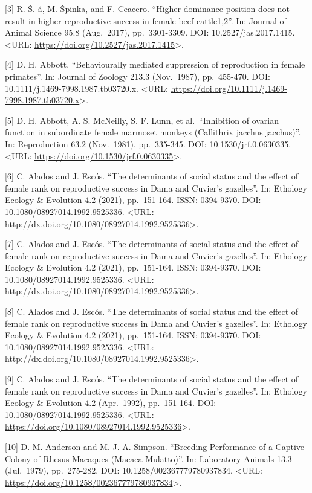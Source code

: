 \documentclass[
]{article}
\begin{document}
{[}3{]} R. Š. á, M. Špinka, and F. Ceacero. ``Higher dominance position
does not result in higher reproductive success in female beef
cattle1,2''. In: Journal of Animal Science 95.8 (Aug.~2017),
pp.~3301-3309. DOI: 10.2527/jas.2017.1415. \textless URL:
\url{https://doi.org/10.2527/jas.2017.1415}\textgreater.

{[}4{]} D. H. Abbott. ``Behaviourally mediated suppression of
reproduction in female primates''. In: Journal of Zoology 213.3
(Nov.~1987), pp.~455-470. DOI: 10.1111/j.1469-7998.1987.tb03720.x.
\textless URL:
\url{https://doi.org/10.1111/j.1469-7998.1987.tb03720.x}\textgreater.

{[}5{]} D. H. Abbott, A. S. McNeilly, S. F. Lunn, et al.~``Inhibition of
ovarian function in subordinate female marmoset monkeys (Callithrix
jacchus jacchus)''. In: Reproduction 63.2 (Nov.~1981), pp.~335-345. DOI:
10.1530/jrf.0.0630335. \textless URL:
\url{https://doi.org/10.1530/jrf.0.0630335}\textgreater.

{[}6{]} C. Alados and J. Escós. ``The determinants of social status and
the effect of female rank on reproductive success in Dama and Cuvier's
gazelles''. In: Ethology Ecology \& Evolution 4.2 (2021), pp.~151-164.
ISSN: 0394-9370. DOI: 10.1080/08927014.1992.9525336. \textless URL:
\url{http://dx.doi.org/10.1080/08927014.1992.9525336}\textgreater.

{[}7{]} C. Alados and J. Escós. ``The determinants of social status and
the effect of female rank on reproductive success in Dama and Cuvier's
gazelles''. In: Ethology Ecology \& Evolution 4.2 (2021), pp.~151-164.
ISSN: 0394-9370. DOI: 10.1080/08927014.1992.9525336. \textless URL:
\url{http://dx.doi.org/10.1080/08927014.1992.9525336}\textgreater.

{[}8{]} C. Alados and J. Escós. ``The determinants of social status and
the effect of female rank on reproductive success in Dama and Cuvier's
gazelles''. In: Ethology Ecology \& Evolution 4.2 (2021), pp.~151-164.
ISSN: 0394-9370. DOI: 10.1080/08927014.1992.9525336. \textless URL:
\url{http://dx.doi.org/10.1080/08927014.1992.9525336}\textgreater.

{[}9{]} C. Alados and J. Escós. ``The determinants of social status and
the effect of female rank on reproductive success in Dama and Cuvier's
gazelles''. In: Ethology Ecology \& Evolution 4.2 (Apr.~1992),
pp.~151-164. DOI: 10.1080/08927014.1992.9525336. \textless URL:
\url{https://doi.org/10.1080/08927014.1992.9525336}\textgreater.

{[}10{]} D. M. Anderson and M. J. A. Simpson. ``Breeding Performance of
a Captive Colony of Rhesus Macaques (Macaca Mulatto)''. In: Laboratory
Animals 13.3 (Jul.~1979), pp.~275-282. DOI: 10.1258/002367779780937834.
\textless URL:
\url{https://doi.org/10.1258/002367779780937834}\textgreater.
\end{document}

